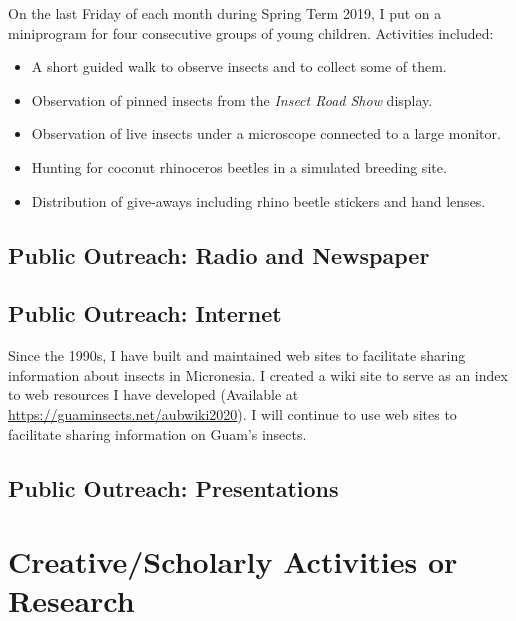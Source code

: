 On the last Friday of each month during Spring Term 2019, I put on a miniprogram for four consecutive groups of young children. Activities included:
\begin{itemize}
	\item A short guided walk to observe insects and to collect some of them.
	\item Observation of pinned insects from the \textit{Insect Road Show} display.
	\item Observation of live insects under a microscope connected to a large monitor.
	\item Hunting for coconut rhinoceros beetles in a simulated breeding site.
	\item Distribution of give-aways including rhino beetle stickers and hand lenses.
\end{itemize}
	

\subsection{Public Outreach: Radio and Newspaper}

\begin{refsection}
	\nocite{*}
	\printbibliography[filter=press, heading=none]
\end{refsection} 

\subsection{Public Outreach: Internet}

Since the 1990s, I have built and maintained web sites to facilitate sharing information about insects in Micronesia. I created a wiki site to serve as an index to web resources I have developed (Available at  \url{https://guaminsects.net/aubwiki2020}). I will continue to use web sites to facilitate sharing information on Guam's insects.

\subsection{Public Outreach: Presentations}
\begin{refsection}
	\nocite{*}
	\printbibliography[heading=none, keyword=Moore-presentations-after-2017]
\end{refsection} 

\pagebreak
\section{Creative/Scholarly Activities or Research}

